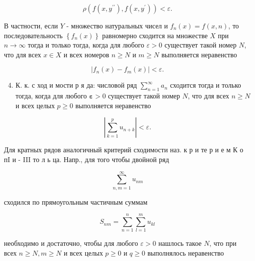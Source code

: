 \documentclass[10pt]{article}
\begin{document}
\[

\rho\left(f\left(x, y^{\prime \prime}\right), f\left(x, y^{\prime}\right)\right)<\varepsilon .

\]



В частности, если $Y$ - множество натуральных чисел и $f_{n}(x)=f(x, n)$, то последовательность $\left\{f_{n}(x)\right\}$ равномерно сходится на множестве $X$ при $n \rightarrow \infty$ тогда и только тогда, когда для любого $\varepsilon>0$ существует такой номер $N$, что для всех $x \in X$ и всех номеров $n \geqslant N$ и $m \geqslant N$ выполняется неравенство



\[

\left|f_{n}(x)-f_{m}(x)\right|<\varepsilon .

\]



\begin{enumerate}

  \setcounter{enumi}{3}

  \item К. к. с ход и мости р я да: числовой ряд $\sum_{n=1}^{\infty} a_{n}$ сходится тогда и только тогда, когда для любого $\boldsymbol{\varepsilon}>0$ существует такой номер $N$, что для всех $n \geqslant N$ и всех целых $p \geqslant 0$ выполняется неравенство

\end{enumerate}



\[

\left|\sum_{k=1}^{p} u_{n+k}\right|<\varepsilon .

\]



Для кратных рядов аналогичный критерий сходимости наз. к р и те р и е м К о пI и - III то л ь ца. Напр., для того чтобы двойной ряд



\[

\sum_{n, m=1}^{\infty} u_{n m}

\]



сходился по прямоугольным частичным суммам



\[

S_{n m}=\sum_{n=1}^{n} \sum_{l=1}^{m} u_{k l}

\]



необходимо и достаточно, чтобы для любого $\varepsilon>0$ нашлось такое $N$, что при всех $n \geqslant N, m \geqslant N$ и всех целых $p \geqslant 0$ и $q \geqslant 0$ выполнялось неравенство
\end{document}
